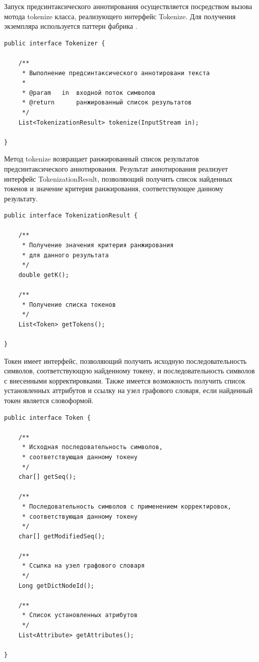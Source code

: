 Запуск предсинтаксического аннотирования осуществляется посредством вызова мотода tokenize класса, реализующего интерфейс Tokenize. Для получения экземпляра используется паттерн фабрика \cite{gof}.
\begin{lstlisting}[caption={Интерфейс модуля предсинтаксического аннотирования}]
public interface Tokenizer {

    /**
     * Выполнение предсинтаксического аннотировани текста
     *
     * @param   in  входной поток символов
     * @return      ранжированный список результатов
     */
    List<TokenizationResult> tokenize(InputStream in);

}
\end{lstlisting}
Метод tokenize возвращает ранжированный список результатов предсинтаксического аннотирования. Результат аннотирования реализует интерфейс TokenizationResult, позволяющий получить список найденных токенов и значение критерия ранжирования, соответствующее данному результату.
\begin{lstlisting}[caption={Интерфейс результата аннотирования}]
public interface TokenizationResult {

    /**
     * Получение значения критерия ранжирования 
     * для данного результата
     */
    double getK();

    /**
     * Получение списка токенов
     */
    List<Token> getTokens();

}
\end{lstlisting}
Токен имеет интерфейс, позволяющий получить исходную последовательность символов, соответствующую найденному токену, и последовательность символов с внесенными корректировками. Также имеется возможность получить список установленных аттрибутов и ссылку на узел графового словаря, если найденный токен является словоформой.
\begin{lstlisting}[caption={Интерфейс токена}]
public interface Token {

    /**
     * Исходная последовательность символов,
     * соответствующая данному токену
     */
    char[] getSeq();

    /**
     * Последовательность символов с применением корректировок,
     * соответствующая данному токену
     */
    char[] getModifiedSeq();

    /**
     * Ссылка на узел графового словаря
     */
    Long getDictNodeId();

    /**
     * Список установленных атрибутов
     */
    List<Attribute> getAttributes();

}
\end{lstlisting}